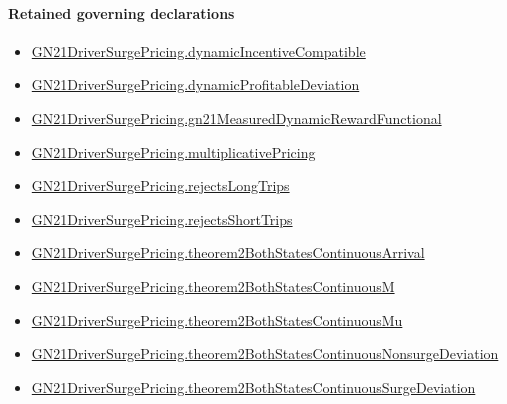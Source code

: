 \documentclass[10pt]{article}
\begin{document}
\paragraph{Retained governing declarations}
\begin{itemize}\raggedright
\item \hyperlink{governing-declaration-dc7e852991fead4e}{GN21\allowbreak{}Driver\allowbreak{}Surge\allowbreak{}Pricing.\allowbreak{}dynamic\allowbreak{}Incentive\allowbreak{}Compatible}
\item \hyperlink{governing-declaration-2bb2716423f1d4af}{GN21\allowbreak{}Driver\allowbreak{}Surge\allowbreak{}Pricing.\allowbreak{}dynamic\allowbreak{}Profitable\allowbreak{}Deviation}
\item \hyperlink{governing-declaration-4219a4705aa43999}{GN21\allowbreak{}Driver\allowbreak{}Surge\allowbreak{}Pricing.\allowbreak{}gn21\allowbreak{}Measured\allowbreak{}Dynamic\allowbreak{}Reward\allowbreak{}Functional}
\item \hyperlink{governing-declaration-dc7605f7de245fe1}{GN21\allowbreak{}Driver\allowbreak{}Surge\allowbreak{}Pricing.\allowbreak{}multiplicative\allowbreak{}Pricing}
\item \hyperlink{governing-declaration-67c84623088357fb}{GN21\allowbreak{}Driver\allowbreak{}Surge\allowbreak{}Pricing.\allowbreak{}rejects\allowbreak{}Long\allowbreak{}Trips}
\item \hyperlink{governing-declaration-2e2c76f2fcbfce41}{GN21\allowbreak{}Driver\allowbreak{}Surge\allowbreak{}Pricing.\allowbreak{}rejects\allowbreak{}Short\allowbreak{}Trips}
\item \hyperlink{governing-declaration-6ea0026837f6d2f1}{GN21\allowbreak{}Driver\allowbreak{}Surge\allowbreak{}Pricing.\allowbreak{}theorem2\allowbreak{}Both\allowbreak{}States\allowbreak{}Continuous\allowbreak{}Arrival}
\item \hyperlink{governing-declaration-e6ec6e5fee073252}{GN21\allowbreak{}Driver\allowbreak{}Surge\allowbreak{}Pricing.\allowbreak{}theorem2\allowbreak{}Both\allowbreak{}States\allowbreak{}Continuous\allowbreak{}M}
\item \hyperlink{governing-declaration-bce48b98e7e89601}{GN21\allowbreak{}Driver\allowbreak{}Surge\allowbreak{}Pricing.\allowbreak{}theorem2\allowbreak{}Both\allowbreak{}States\allowbreak{}Continuous\allowbreak{}Mu}
\item \hyperlink{governing-declaration-be7b28b7e5bbcddc}{GN21\allowbreak{}Driver\allowbreak{}Surge\allowbreak{}Pricing.\allowbreak{}theorem2\allowbreak{}Both\allowbreak{}States\allowbreak{}Continuous\allowbreak{}Nonsurge\allowbreak{}Deviation}
\item \hyperlink{governing-declaration-1cbbec80fc1f1cfc}{GN21\allowbreak{}Driver\allowbreak{}Surge\allowbreak{}Pricing.\allowbreak{}theorem2\allowbreak{}Both\allowbreak{}States\allowbreak{}Continuous\allowbreak{}Surge\allowbreak{}Deviation}
\end{itemize}
\end{document}
